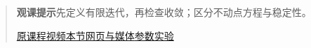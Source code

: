 \begin{quote}\small\textbf{观课提示}\quad 先定义有限迭代，再检查收敛；区分不动点方程与稳定性。

\href{https://www.youtube.com/watch?v=elQVZLLiod4}{原课程视频}\quad\href{https://vitael04213.github.io/3blue1brown-notes/lessons/ldm-power-towers.html}{本节网页与媒体}\quad\href{https://vitael04213.github.io/3blue1brown-notes/lab.html\#iteration}{参数实验}
\end{quote}
